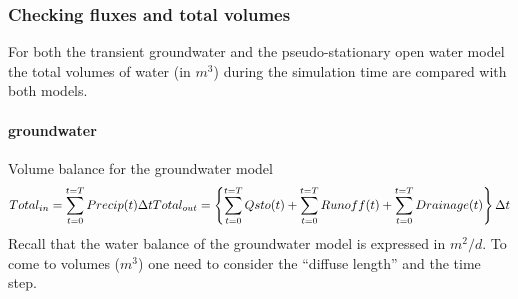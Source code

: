 \documentclass[
]{article}
\begin{document}
\hypertarget{checking-fluxes-and-total-volumes}{%
\subsubsection{Checking fluxes and total
volumes}\label{checking-fluxes-and-total-volumes}}

For both the transient groundwater and the pseudo-stationary open water
model the total volumes of water (in \(m^3\)) during the simulation time
are compared with both models.

\hypertarget{groundwater}{%
\paragraph{groundwater}\label{groundwater}}

Volume balance for the groundwater model \[
Total_{in} = \sum_{t= 0}^{t=T}Precip(t)\Delta t\\
Total_{out} = \left \{ \sum_{t=0}^{t=T} Qsto(t)+\sum_{t=0}^{t=T} Runoff(t) + \sum_{t=0}^{t=T} Drainage(t) \right \} \Delta t
\] Recall that the water balance of the groundwater model is expressed
in \(m^2/d\). To come to volumes (\(m^3\)) one need to consider the
``diffuse length'' and the time step.
\end{document}
